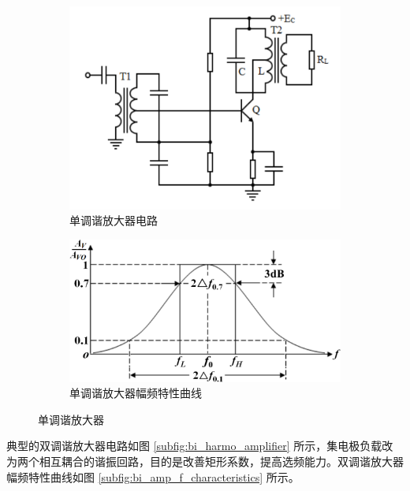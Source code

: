 \documentclass[UTF8]{ctexart}
\begin{document}
\begin{figure}[H]
    \centering
    \begin{subfigure}[t]{0.45\textwidth}
        \centering
        \includegraphics[width=\textwidth]{pics/mono_harmo_amplifier.png}
        \caption{单调谐放大器电路}\label{subfig:mono_harmo_amplifier}
    \end{subfigure}
    \begin{subfigure}[t]{0.45\textwidth}
        \centering
        \includegraphics[width=\textwidth]{pics/mono_amp_f_characteristics.png}\caption{单调谐放大器幅频特性曲线}\label{subfig:mono_amp_f_characteristics}
    \end{subfigure}
    \caption{单调谐放大器}\label{fig:mono_harmo_amplifier}
\end{figure}

典型的双调谐放大器电路如图 \ref{subfig:bi_harmo_amplifier} 所示，集电极负载改为两个相互耦合的谐振回路，目的是改善矩形系数，提高选频能力。双调谐放大器幅频特性曲线如图 \ref{subfig:bi_amp_f_characteristics} 所示。
\end{document}
